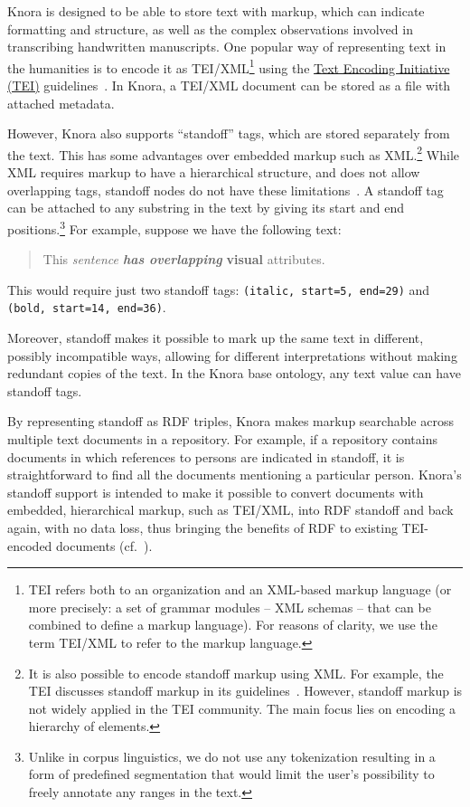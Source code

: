 \documentclass[12pt, a4paper]{article}
\begin{document}
\label{sec:standoff}

Knora is designed to be able to store text with markup, which can indicate formatting and structure, as well as the complex observations involved in transcribing handwritten manuscripts. One popular way of representing text in the humanities is to encode it as TEI/XML\footnote{TEI refers both to an organization and an XML-based markup language (or more precisely: a set of grammar modules -- XML schemas -- that can be combined to define a markup language). For reasons of clarity, we use the term TEI/XML to refer to the markup language.} using the \href{http://www.tei-c.org/index.xml}{Text Encoding Initiative (TEI)} guidelines~\cite{P5}. In Knora, a TEI/XML document can be stored as a file with attached metadata.

However, Knora also supports \enquote{standoff} tags, which are stored separately from the text. This has some advantages over embedded markup such as XML.\footnote{It is also possible to encode standoff markup using XML. For example, the TEI discusses standoff markup in its guidelines~\cite[chapters 16.9 and 20.4]{P5}. However, standoff markup is not widely applied in the TEI community. The main focus lies on encoding a hierarchy of elements.} While XML requires markup to have a hierarchical structure, and does not allow overlapping tags, standoff nodes do not have these limitations~\cite{Schmidt_Standoff}. A standoff tag can be attached to any substring in the text by giving its start and end positions.\footnote{Unlike in corpus linguistics, we do not use any tokenization resulting in a form of predefined segmentation that would limit the user's possibility to freely annotate any ranges in the text.} For example, suppose we have the following text:

\begin{quote}
This \textit{sentence \textbf{has overlapping}}\textbf{ visual} attributes.
\end{quote}

This would require just two standoff tags: \texttt{(italic, start=5, end=29)} and \texttt{(bold, start=14, end=36)}.

Moreover, standoff makes it possible to mark up the same text in different, possibly incompatible ways, allowing for different interpretations without making redundant copies of the text. In the Knora base ontology, any text value can have standoff tags.

By representing standoff as RDF triples, Knora makes markup searchable across multiple text documents in a repository. For example, if a repository contains documents in which references to persons are indicated in standoff, it is straightforward to find all the documents mentioning a particular person. Knora's standoff support is intended to make it possible to convert documents with embedded, hierarchical markup, such as TEI/XML, into RDF standoff and back again, with no data loss, thus bringing the benefits of RDF to existing TEI-encoded documents (cf.~\cite[3]{Schmidt_Standoff}).
\end{document}
